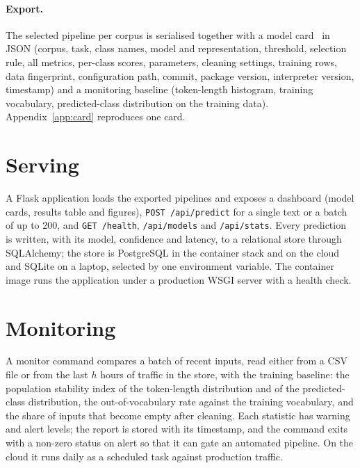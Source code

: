 \paragraph{Export.} The selected pipeline per corpus is serialised together with a model card~\cite{mitchell2019} in JSON (corpus, task, class names, model and representation, threshold, selection rule, all metrics, per-class scores, parameters, cleaning settings, training rows, data fingerprint, configuration path, commit, package version, interpreter version, timestamp) and a monitoring baseline (token-length histogram, training vocabulary, predicted-class distribution on the training data). Appendix~\ref{app:card} reproduces one card.

\section{Serving}
A Flask application loads the exported pipelines and exposes a dashboard (model cards, results table and figures), \texttt{POST /api/predict} for a single text or a batch of up to 200, and \texttt{GET /health}, \texttt{/api/models} and \texttt{/api/stats}. Every prediction is written, with its model, confidence and latency, to a relational store through SQLAlchemy; the store is PostgreSQL in the container stack and on the cloud and SQLite on a laptop, selected by one environment variable. The container image runs the application under a production WSGI server with a health check.

\section{Monitoring}
A monitor command compares a batch of recent inputs, read either from a CSV file or from the last $h$ hours of traffic in the store, with the training baseline: the population stability index of the token-length distribution and of the predicted-class distribution, the out-of-vocabulary rate against the training vocabulary, and the share of inputs that become empty after cleaning. Each statistic has warning and alert levels; the report is stored with its timestamp, and the command exits with a non-zero status on alert so that it can gate an automated pipeline. On the cloud it runs daily as a scheduled task against production traffic.

